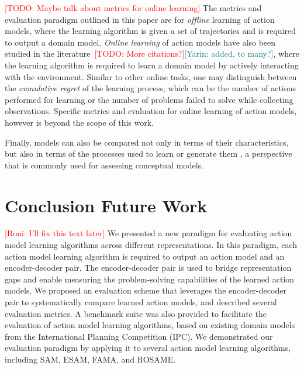 \documentclass{article}
\theoremstyle{definition}
\theoremstyle{remark}
\newcommand{\todo}[1]{{\textcolor{red}{[TODO: #1]}}}
\newcommand{\roni}[1]{{\textcolor{red}{[Roni: #1]}}}
\newcommand{\yarin}[1]{{\textcolor{teal}{[Yarin: #1]}}}
\begin{document}
\todo{Maybe talk about metrics for online learning}
The metrics and evaluation paradigm outlined in this paper are for \emph{offline} learning of action models, where the learning algorithm is given a set of trajectories and is required to output a domain model. \emph{Online learning} of action models have also been studied in the literature~\citep{lamanna2021online, sreedharan2023optimistic, benyamin2025integratingreinforcementlearningaction, ng2019incremental, chitnis2021glib, verma2023autonomous, karia2023epistemic, jin2022creativity}\todo{More citations?}\yarin{added, to many?}, where the learning algorithm is required to learn a domain model by actively interacting with the environment. Similar to other online tasks, one may distinguish between the \emph{cumulative regret} of the learning process, which can be the number of actions performed for learning or the number of problems failed to solve while collecting observations. 
Specific metrics and evaluation for online learning of action models, however is beyond the scope of this work. 

Finally, models can also be compared not only in terms of their characteristics, but also in terms of the processes used to learn or generate them \citep{vallati2021quality}, a perspective that is commonly used for assessing conceptual models.

\section{Conclusion Future Work}
\roni{I'll fix this text later}
We presented a new paradigm for evaluating action 
model learning algorithms across different representations. In this paradigm, each action model learning algorithm is required to output an action model and an encoder-decoder pair. The encoder-decoder pair is used to bridge representation gaps and enable measuring the problem-solving capabilities of the learned action models. We proposed an evaluation scheme that leverages the encoder-decoder pair to systematically compare learned action models, and described several evaluation metrics. A benchmark suite was also provided to facilitate the evaluation of action model learning algorithms, based on existing domain models from the International Planning Competition (IPC). We demonstrated our evaluation paradigm by applying it to several action model learning algorithms, including SAM, ESAM, FAMA, and ROSAME.




 
\end{document}
